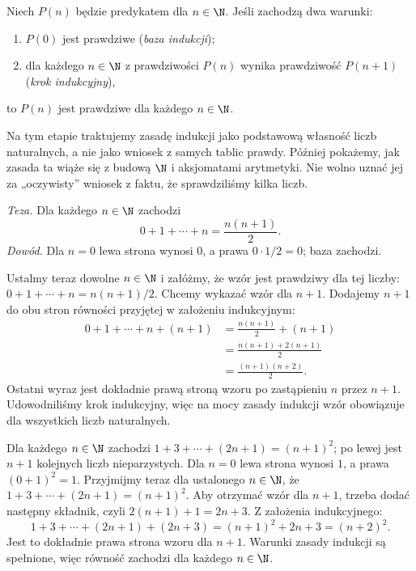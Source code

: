 \begin{twierdzenie}
\label{thm:induction}
Niech $P(n)$ będzie predykatem dla $n\in\N$.
Jeśli zachodzą dwa warunki:
\begin{enumerate}[label=(\roman*)]
\item $P(0)$ jest prawdziwe (\emph{baza indukcji});
\item dla każdego $n\in\N$ z prawdziwości $P(n)$
      wynika prawdziwość $P(n+1)$ (\emph{krok indukcyjny}),
\end{enumerate}
to $P(n)$ jest prawdziwe dla każdego $n\in\N$.
\end{twierdzenie}

\begin{uwaga}
Na tym etapie traktujemy zasadę indukcji jako
podstawową własność liczb naturalnych, a nie jako
wniosek z samych tablic prawdy. Później pokażemy,
jak zasada ta wiąże się z budową $\N$ i aksjomatami
arytmetyki. Nie wolno uznać jej za „oczywisty”
wniosek z faktu, że sprawdziliśmy kilka liczb.
\end{uwaga}

\begin{przyklad}
\label{ex:gauss-induction}
\emph{Teza.} Dla każdego $n\in\N$ zachodzi
\[
0+1+\cdots+n=\frac{n(n+1)}2.
\]
\emph{Dowód.} Dla $n=0$ lewa strona wynosi $0$,
a prawa $0\cdot1/2=0$; baza zachodzi.

Ustalmy teraz dowolne $n\in\N$ i załóżmy,
że wzór jest prawdziwy dla tej liczby:
$0+1+\cdots+n=n(n+1)/2$. Chcemy wykazać
wzór dla $n+1$. Dodajemy $n+1$ do obu stron
równości przyjętej w założeniu indukcyjnym:
\begin{align*}
0+1+\cdots+n+(n+1)
&=\frac{n(n+1)}2+(n+1)\\
&=\frac{n(n+1)+2(n+1)}2\\
&=\frac{(n+1)(n+2)}2.
\end{align*}
Ostatni wyraz jest dokładnie prawą stroną
wzoru po zastąpieniu $n$ przez $n+1$.
Udowodniliśmy krok indukcyjny, więc
na mocy zasady indukcji wzór obowiązuje
dla wszystkich liczb naturalnych.
\end{przyklad}

\begin{przyklad}
\label{ex:odd-sum-induction-xli}
Dla każdego $n\in\N$ zachodzi
$1+3+\cdots+(2n+1)=(n+1)^2$; po lewej jest
$n+1$ kolejnych liczb nieparzystych.
Dla $n=0$ lewa strona wynosi $1$, a prawa $(0+1)^2=1$.
Przyjmijmy teraz dla ustalonego $n\in\N$, że
$1+3+\cdots+(2n+1)=(n+1)^2$. Aby otrzymać wzór
dla $n+1$, trzeba dodać następny składnik, czyli
$2(n+1)+1=2n+3$. Z założenia indukcyjnego:
\[
1+3+\cdots+(2n+1)+(2n+3)
 =(n+1)^2+2n+3=(n+2)^2.
\]
Jest to dokładnie prawa strona wzoru dla $n+1$.
Warunki zasady indukcji są spełnione, więc
równość zachodzi dla każdego $n\in\N$.
\end{przyklad}

